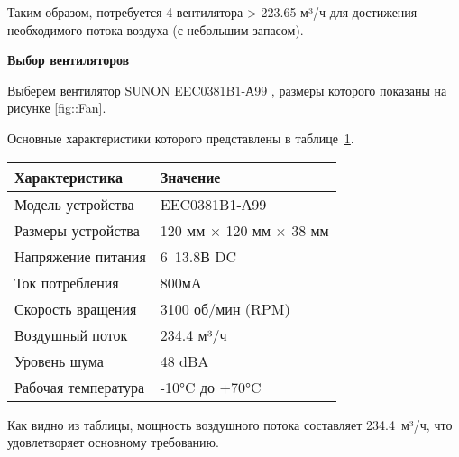 Таким образом, потребуется 4 вентилятора > 223.65 м³/ч для достижения необходимого потока воздуха (с небольшим запасом).

\textbf{Выбор вентиляторов}

Выберем вентилятор SUNON EEC0381B1-А99 \cite{datasheet::Fan}, размеры которого показаны на рисунке \ref{fig::Fan}.


Основные характеристики которого представлены в таблице~\ref{tab::FanCharacteristics}.

\begin{table}[H]
	\centering
	\caption{Основные характеристики вентилятора EEC0381B1-А99}
	\begin{longtable}{| m{7cm} | m{7cm} |}
		\hline
		\textbf{Характеристика} & \textbf{Значение} \\ \hline
		\endhead \hline
		Модель устройства & EEC0381B1-А99 \\ \hline
		Размеры устройства & 120 мм × 120 мм × 38 мм \\ \hline
		Напряжение питания & 6~13.8В DC \\ \hline
		Ток потребления & 800мА \\ \hline
		Скорость вращения & 3100 об/мин (RPM) \\ \hline
		Воздушный поток & 234.4 м³/ч \\ \hline
		Уровень шума & 48 dBA \\ \hline
		Рабочая температура & -10°C до +70°C \\ \hline
	\end{longtable}
	\label{tab::FanCharacteristics}
\end{table}

Как видно из таблицы, мощность воздушного потока составляет 234.4~м³/ч, что удовлетворяет основному требованию.

